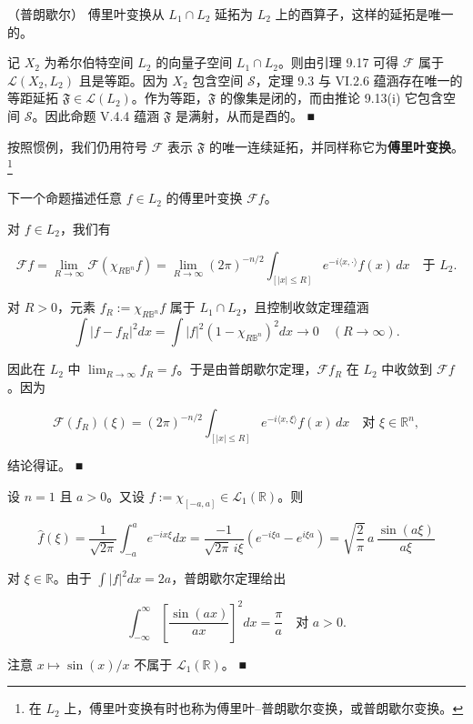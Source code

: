 \begin{theorem}

（普朗歇尔） 傅里叶变换从 $ L_1 \cap L_2 $ 延拓为 $ L_2 $ 上的酉算子，这样的延拓是唯一的。

\proofhead
记 $ X_2 $ 为希尔伯特空间 $ L_2 $ 的向量子空间 $ L_1 \cap L_2 $。则由引理 9.17 可得 $ \mathcal{F} $ 属于 $ \mathcal{L}(X_2, L_2) $ 且是等距。因为 $ X_2 $ 包含空间 $ \mathcal{S} $，定理 9.3 与 VI.2.6 蕴涵存在唯一的等距延拓 $ \mathfrak{F} \in \mathcal{L}(L_2) $。作为等距，$ \mathfrak{F} $ 的像集是闭的，而由推论 9.13(i) 它包含空间 $ \mathcal{S} $。因此命题 V.4.4 蕴涵 $ \mathfrak{F} $ 是满射，从而是酉的。 \nobreak\hspace{0.35em}■
\end{theorem}

按照惯例，我们仍用符号 $ \mathcal{F} $ 表示 $ \mathfrak{F} $ 的唯一连续延拓，并同样称它为\textbf{傅里叶变换}。\footnote{在 $ L_2 $ 上，傅里叶变换有时也称为傅里叶–普朗歇尔变换，或普朗歇尔变换。}

下一个命题描述任意 $ f \in L_2 $ 的傅里叶变换 $ \mathcal{F}f $。

\begin{proposition}

对 $ f \in L_2 $，我们有

\[
\mathcal{F}f = \lim_{R \to \infty} \mathcal{F}(\chi_{R\mathbb{B}^n}f) = \lim_{R \to \infty} (2\pi)^{-n/2} \int_{[|x| \le R]} e^{-i\langle x,\cdot\rangle} f(x)\,dx \quad \text{于 } L_2 .
\]

\proofhead
对 $ R > 0 $，元素 $ f_R := \chi_{R\mathbb{B}^n}f $ 属于 $ L_1 \cap L_2 $，且控制收敛定理蕴涵
\[
\int |f - f_R|^2 dx = \int |f|^2 (1 - \chi_{R\mathbb{B}^n})^2 dx \to 0 \quad (R \to \infty) .
\]

因此在 $ L_2 $ 中 $ \lim_{R \to \infty} f_R = f $。于是由普朗歇尔定理，$ \mathcal{F}f_R $ 在 $ L_2 $ 中收敛到 $ \mathcal{F}f $。因为

\[
\mathcal{F}(f_R)(\xi) = (2\pi)^{-n/2} \int_{[|x| \le R]} e^{-i\langle x,\xi\rangle} f(x)\,dx \quad \text{对 } \xi \in \mathbb{R}^n ,
\]

结论得证。 \nobreak\hspace{0.35em}■

\end{proposition}

\begin{example}

设 $ n = 1 $ 且 $ a > 0 $。又设 $ f := \chi_{[-a,a]} \in \mathcal{L}_1(\mathbb{R}) $。则

\[
\hat{f}(\xi) = \frac{1}{\sqrt{2\pi}} \int_{-a}^{a} e^{-ix\xi} dx = \frac{-1}{\sqrt{2\pi}\, i\xi}\left(e^{-i\xi a} - e^{i\xi a}\right) = \sqrt{\frac{2}{\pi}}\, a\, \frac{\sin(a\xi)}{a\xi}
\]

对 $ \xi \in \mathbb{R} $。由于 $ \int |f|^2 dx = 2a $，普朗歇尔定理给出

\[
\int_{-\infty}^{\infty} \left[\frac{\sin(ax)}{ax}\right]^2 dx = \frac{\pi}{a} \quad \text{对 } a > 0 .
\]

注意 $ x \mapsto \sin(x)/x $ 不属于 $ \mathcal{L}_1(\mathbb{R}) $。 \nobreak\hspace{0.35em}■

\end{example}

